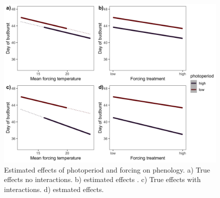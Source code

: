 \documentclass[11pt]{article}
\begin{document}
 
 \begin{figure}[h!]
    \centering
 \includegraphics[width=.8\textwidth]{..//Plots/periodicity_figures/apparent.jpeg}
    \caption{Estimated effects of photoperiod and forcing on phenology. a) True effects no interactions. b) estimated effects . c) True effects with interactions. d) estmated effects.}
    \label{fig:3d}
\end{figure}
 
\end{document}
